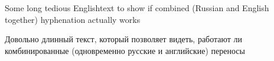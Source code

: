 \documentclass{article}
\begin{document}
\begin{boxedminipage}{1.2cm}
Some long tedious Englishtext to show if combined (Russian and English together) hyphenation actually works
\end{boxedminipage}

\begin{boxedminipage}{1.2cm}
Довольно длинный текст, который позволяет видеть, работают ли комбинированные (одновременно русские и английские) переносы
\end{boxedminipage}
\end{document}
